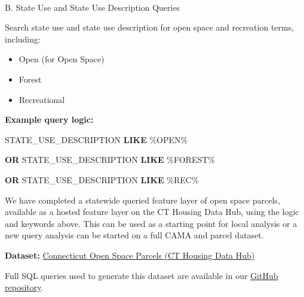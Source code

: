 \documentclass[
  letterpaper,
  DIV=11,
  numbers=noendperiod]{scrreprt}
\makeatletter
\let\oldparagraph\paragraph
\renewcommand{\paragraph}{
    \@ifstar
      \xxxParagraphStar
      \xxxParagraphNoStar
  }
\newcommand{\xxxParagraphStar}[1]{\oldparagraph*{#1}\mbox{}}
\newcommand{\xxxParagraphNoStar}[1]{\oldparagraph{#1}\mbox{}}
\newenvironment{Shaded}{\begin{snugshade}}{\end{snugshade}}
\newcommand{\KeywordTok}[1]{\textcolor[rgb]{0.00,0.23,0.31}{\textbf{#1}}}
\newcommand{\NormalTok}[1]{\textcolor[rgb]{0.00,0.23,0.31}{#1}}
\newcommand{\StringTok}[1]{\textcolor[rgb]{0.13,0.47,0.30}{#1}}
\providecommand{\tightlist}{%
  \setlength{\itemsep}{0pt}\setlength{\parskip}{0pt}}
\makeatother
\begin{document}
\paragraph{B. State Use and State Use Description
Queries}\label{b.-state-use-and-state-use-description-queries-1}

Search state use and state use description for open space and recreation
terms, including:

\begin{itemize}
\tightlist
\item
  Open (for Open Space)
\item
  Forest
\item
  Recreational
\end{itemize}

\textbf{Example query logic:}

\begin{Shaded}
\begin{Highlighting}[]
\NormalTok{STATE\_USE\_DESCRIPTION }\KeywordTok{LIKE} \StringTok{\textquotesingle{}\%OPEN\%\textquotesingle{}}
    
\KeywordTok{OR}\NormalTok{ STATE\_USE\_DESCRIPTION }\KeywordTok{LIKE} \StringTok{\textquotesingle{}\%FOREST\%\textquotesingle{}}
    
\KeywordTok{OR}\NormalTok{ STATE\_USE\_DESCRIPTION }\KeywordTok{LIKE} \StringTok{\textquotesingle{}\textquotesingle{}}\NormalTok{\%REC\%}\StringTok{\textquotesingle{}}
\end{Highlighting}
\end{Shaded}

\begin{tcolorbox}[enhanced jigsaw, arc=.35mm, bottomrule=.15mm, breakable, colback=white, colframe=quarto-callout-note-color-frame, left=2mm, leftrule=.75mm, opacityback=0, rightrule=.15mm, toprule=.15mm]

We have completed a statewide queried feature layer of open space
parcels, available as a hosted feature layer on the CT Housing Data Hub,
using the logic and keywords above. This can be used as a starting point
for local analysis or a new query analysis can be started on a full CAMA
and parcel dataset.

\textbf{Dataset:}
\href{https://housingmaps.ct.gov/datasets/ctmaps::connecticut-protected-open-space-parcels/about}{Connecticut
Open Space Parcels (CT Housing Data Hub)}

Full SQL queries used to generate this dataset are available in our
\href{https://github.com/ctgisoffice/housing/blob/main/SQL_Open_Space_Parcels.sql}{GitHub
repository}.

\end{tcolorbox}
\end{document}
